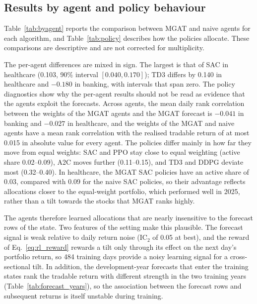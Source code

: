 


\subsection{Results by agent and policy behaviour}\label{subsec:sector}

{\color{blue}Table~\ref{tab:byagent} reports the comparison between MGAT and naive agents for each algorithm, and Table~\ref{tab:policy} describes how the policies allocate. These comparisons are descriptive and are not corrected for multiplicity.

The per-agent differences are mixed in sign. The largest is that of SAC in healthcare (0.103, 90\% interval $[0.040, 0.170]$); TD3 differs by 0.140 in healthcare and $-0.180$ in banking, with intervals that span zero. The policy diagnostics show why the per-agent results should not be read as evidence that the agents exploit the forecasts. Across agents, the mean daily rank correlation between the weights of the MGAT agents and the MGAT forecast is $-0.041$ in banking and $-0.027$ in healthcare, and the weights of the MGAT and naive agents have a mean rank correlation with the realised tradable return of at most 0.015 in absolute value for every agent. The policies differ mainly in how far they move from equal weights: SAC and PPO stay close to equal weighting (active share 0.02--0.09), A2C moves further (0.11--0.15), and TD3 and DDPG deviate most (0.32--0.40). In healthcare, the MGAT SAC policies have an active share of 0.03, compared with 0.09 for the naive SAC policies, so their advantage reflects allocations closer to the equal-weight portfolio, which performed well in 2025, rather than a tilt towards the stocks that MGAT ranks highly.

The agents therefore learned allocations that are nearly insensitive to the forecast rows of the state. Two features of the setting make this plausible. The forecast signal is weak relative to daily return noise (IC$_2$ of 0.05 at best), and the reward of Eq.~\eqref{eq:rl_reward} rewards a tilt only through its effect on the next day's portfolio return, so 484 training days provide a noisy learning signal for a cross-sectional tilt. In addition, the development-year forecasts that enter the training states rank the tradable return with different strength in the two training years (Table~\ref{tab:forecast_years}), so the association between the forecast rows and subsequent returns is itself unstable during training.\par}

